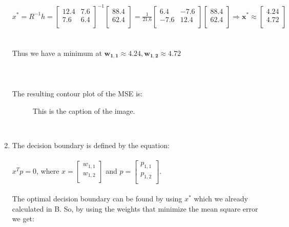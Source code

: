 \documentclass{article}
\begin{document}
\begin{enumerate}[label=\Alph*]
    $x^* = R^{-1}h = 
    \begin{bmatrix}
      12.4 & 7.6 \\
      7.6 & 6.4 \\
    \end{bmatrix}^{-1}
    \begin{bmatrix}
      88.4 \\
      62.4 \\
    \end{bmatrix} = \frac{1}{21.6}
    \begin{bmatrix}
      6.4 & -7.6 \\
      -7.6 & 12.4 \\
    \end{bmatrix}
    \begin{bmatrix}
      88.4 \\
      62.4 \\
    \end{bmatrix} \Rightarrow \bm{x^* \approx} 
    \begin{bmatrix}
      \bm{4.24} \\
      \bm{4.72} \\
    \end{bmatrix}$ \\ \\ \\Thus we have a minimum at $\bm{w_{1,1} \approx 4.24, w_{1,2} \approx 4.72}$ \\ \\ \\ \\
    The resulting contour plot of the MSE is: \\
    \begin{figure}[h]
      \centering
      \caption{This is the caption of the image.}
    \end{figure} \\
  \item The decision boundary is defined by the equation:\\ \\ $x^Tp = 0$, where $x = 
    \begin{bmatrix}
      w_{1,1} \\
      w_{1,2} \\
    \end{bmatrix}$ and $p = 
    \begin{bmatrix}
      p_{1,1} \\
      p_{1,2} \\
    \end{bmatrix}$.\\ \\ The optimal decision boundary can be found by using $x^*$ which we already calculated in B. So, by using the weights that minimize the mean square error we get: \\ \\

\end{enumerate}
\end{document}
